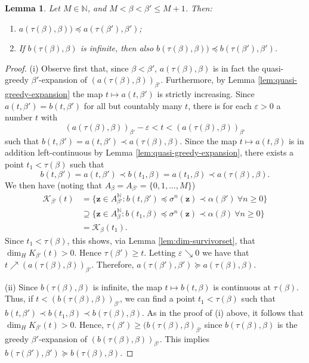 \documentclass[12pt]{amsart}
\newtheorem{lemma}[theorem]{Lemma}
\theoremstyle{definition}
\theoremstyle{remark}
\numberwithin{equation}{section}
\newcommand{\N}{\ensuremath{\mathbb{N}}}
\newcommand{\z}{\mathbf{z}}
\newcommand{\ep}{\varepsilon}
\newcommand{\al}{\alpha}
\newcommand{\lle}{\preccurlyeq}
\newcommand{\lge}{\succcurlyeq}
\newcommand{\si}{\sigma}
\newcommand{\K}{\mathcal K}
\begin{document}
{\begin{lemma} \label{lem:greedy-monotonicity}
Let $M\in\N$, and $M<\beta<\beta'\leq M+1$. Then:
\begin{enumerate}[{\rm(i)}]
\item $a(\tau(\beta),\beta))\lle {a(\tau(\beta'),\beta')}$;
\item If $b(\tau(\beta),\beta)$ is infinite, then also $b(\tau(\beta),\beta))\lle b(\tau(\beta'),\beta')$.
\end{enumerate}
\end{lemma}

\begin{proof}
(i) Observe first that, since $\beta<\beta'$, $a(\tau(\beta),\beta)$ is in fact the quasi-greedy $\beta'$-expansion of $(a(\tau(\beta),\beta))_{\beta'}$. Furthermore, by Lemma \ref{lem:quasi-greedy-expansion} the map $t\mapsto a(t,\beta')$ is strictly increasing. Since $a(t,\beta')=b(t,\beta')$ for all but countably many $t$, there is for each $\ep>0$ a number $t$ with
\[
(a(\tau(\beta),\beta))_{\beta'}-\ep<t<(a(\tau(\beta),\beta))_{\beta'}
\]
such that $b(t,\beta')=a(t,\beta')\prec a(\tau(\beta),\beta)$. Since the map $t\mapsto a(t,\beta)$ is in addition left-continuous by Lemma \ref{lem:quasi-greedy-expansion}, there exists a point $t_1<\tau(\beta)$ such that
\[
b(t,\beta')=a(t,\beta')\prec b(t_1,\beta)=a(t_1,\beta)\prec a(\tau(\beta),\beta).
\]
We then have (noting that $A_\beta=A_{\beta'}=\{0,1,\dots,M\}$)
\begin{align*}
\K_{\beta'}(t)&=\{\z\in A_{\beta'}^\N: b(t,\beta')\lle \si^n(\z)\prec\al(\beta')\ \forall n\geq 0\}\\
&\supseteq \{\z\in A_\beta^\N: b(t_1,\beta)\lle \si^n(\z)\prec\al(\beta)\ \forall n\geq 0\}\\
&=\K_\beta(t_1).
\end{align*}
Since $t_1<\tau(\beta)$, this shows, via Lemma \ref{lem:dim-survivorset}, that $\dim_H K_{\beta'}(t)>0$. Hence $\tau(\beta')\geq t$. Letting $\ep\searrow 0$ we have that $t\nearrow (a(\tau(\beta),\beta))_{\beta'}$. Therefore, $a(\tau(\beta'),\beta')\lge a(\tau(\beta),\beta)$.

(ii) Since $b(\tau(\beta),\beta)$ is infinite, the map $t\mapsto b(t,\beta)$ is continuous at $\tau(\beta)$. Thus, if $t<(b(\tau(\beta),\beta))_{\beta'}$, we can find a point $t_1<\tau(\beta)$ such that $b(t,\beta')\prec b(t_1,\beta)\prec b(\tau(\beta),\beta)$. As in the proof of (i) above, it follows that $\dim_H K_{\beta'}(t)>0$. Hence, $\tau(\beta')\geq (b(\tau(\beta),\beta)_{\beta'}$ since $b(\tau(\beta),\beta)$ is the greedy $\beta'$-expansion of $(b(\tau(\beta),\beta))_{\beta'}$. This implies $b(\tau(\beta'),\beta')\lge b(\tau(\beta),\beta)$.
\end{proof}

}
\end{document}

